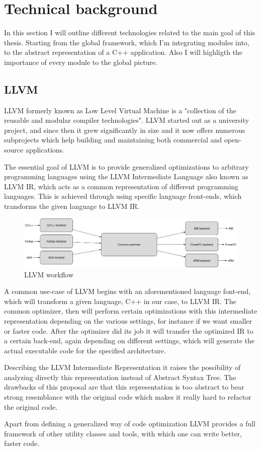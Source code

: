 \section{Technical background}
\par In this section I will outline different technologies related to the main goal of this thesis. Starting from the global framework, which I'm integrating modules into, to the abstract representation of a C++ application. Also I will highligth the importance of every module to the global picture.

\subsection{LLVM}
\par LLVM formerly known as Low Level Virtual Machine is a "collection of the reusable and modular compiler technologies"\cite{llvm_mainpage}. LLVM started out as a university project\cite{LLVM:CGO04}, and since then it grew significantly in size and it now offers numerous subprojects which help building and maintaining both commercial and open-source applications. \medskip
\par The essential goal of LLVM is to provide generalized optimizations to arbitrary programming languages using the LLVM Intermediate Language also known as LLVM IR, which acts as a common representation of different programming languages. This is achieved through using specific language front-ends, which transforms the given language to LLVM IR. 
\begin{figure}[h]
	\caption{LLVM workflow}
	\includegraphics[scale=0.33]{images/llvm_flow}
\end{figure}
\par A common use-case of LLVM begins with an aforementioned language font-end, which will transform a given language, C++ in our case, to LLVM IR. The common optimizer, then will perform certain optimizations with this intermediate representation depending on the various settings, for instance if we want smaller or faster code. After the optimizer did its job it will transfer the optimized IR to a certain back-end, again depending on different settings, which will generate the actual executable code for the specified architecture. \medskip
\par Describing the LLVM Intermediate Representation it raises the possibility of analyzing directly this representation instead of Abstract Syntax Tree. The drawbacks of this proposal are that this representation is too abstract to bear strong resemblance with the original code which makes it really hard to refactor the original code.
\par Apart from defining a generalized way of code optimization LLVM provides a full framework of other utility classes and tools, with which one can write better, faster code.

